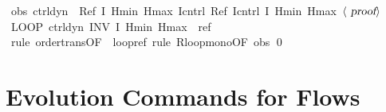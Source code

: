 \documentclass[envcountsame,envcountsect]{llncs}
\begin{document}
\begin{example}
\begin{isabellebody}
\ obs{\isacharcolon}\ {\isachardoublequoteopen}{\isacharquery}ctrl{\isacharsemicolon}{\isacharquery}dyn\ {\isasymle}\ Ref\ {\isasymlceil}I\ Hmin\ Hmax{\isasymrceil}\ {\isasymlceil}{\isacharquery}Icntrl{\isasymrceil}{\isacharsemicolon}\ {\isacharparenleft}Ref\ {\isasymlceil}{\isacharquery}Icntrl{\isasymrceil}\ {\isasymlceil}I\ Hmin\ Hmax{\isasymrceil}{\isacharparenright}{\isachardoublequoteclose}\ $\langle \isa{proof}\rangle$\isanewline
\ \ \isamarkupfalse%
\ {\isachardoublequoteopen}LOOP\ {\isacharparenleft}{\isacharquery}ctrl{\isacharsemicolon}{\isacharquery}dyn{\isacharparenright}\ INV\ I\ Hmin\ Hmax\ {\isasymle}\ {\isacharquery}ref{\isachardoublequoteclose}\isanewline
\ \ \ \ \isamarkupfalse%
\ {\isacharparenleft}rule\ order{\isacharunderscore}trans{\isacharbrackleft}OF\ {\isacharunderscore}\ loopref{\isacharbrackright}{\isacharcomma}\ rule\ R{\isacharunderscore}loop{\isacharunderscore}mono{\isacharbrackleft}OF\ obs{\isacharbrackright}{\isacharparenright}\isanewline
{}\qed
\end{isabellebody}
\end{example}


\section{Evolution Commands for Flows}\label{sec:from-flows}
\end{document}
